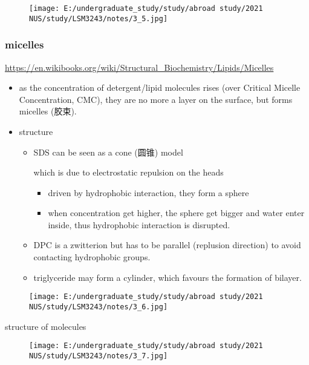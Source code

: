 \documentclass[]{article}
\begin{document}
\begin{figure}
\centering
\texttt{[image: E:/undergraduate\_study/study/abroad study/2021 NUS/study/LSM3243/notes/3\_5.jpg]}
\caption{}
\end{figure}

\hypertarget{micelles}{%
\subsubsection{micelles}\label{micelles}}

\url{https://en.wikibooks.org/wiki/Structural_Biochemistry/Lipids/Micelles}

\begin{itemize}
\item
  as the concentration of detergent/lipid molecules rises (over Critical
  Micelle Concentration, CMC), they are no more a layer on the surface,
  but forms micelles (胶束).
\item
  structure

  \begin{itemize}
  \item
    SDS can be seen as a cone (圆锥) model

     which is due to electrostatic repulsion on the heads 

    \begin{itemize}
    \item
      driven by hydrophobic interaction, they form a sphere
    \item
      when concentration get higher, the sphere get bigger and water
      enter inside, thus hydrophobic interaction is disrupted.
    \end{itemize}
  \item
    DPC is a zwitterion but has to be parallel (replusion direction) to
    avoid contacting hydrophobic groups.
  \item
    triglyceride may form a cylinder, which favours the formation of
    bilayer.
  \end{itemize}
\end{itemize}

\begin{figure}
\centering
\texttt{[image: E:/undergraduate\_study/study/abroad study/2021 NUS/study/LSM3243/notes/3\_6.jpg]}
\caption{}
\end{figure}

structure of molecules

\begin{figure}
\centering
\texttt{[image: E:/undergraduate\_study/study/abroad study/2021 NUS/study/LSM3243/notes/3\_7.jpg]}
\caption{}
\end{figure}
\end{document}

